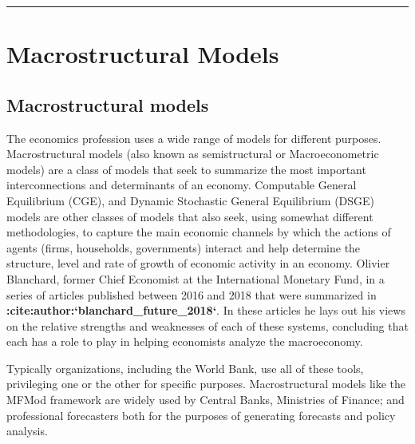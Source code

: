 \documentclass[letterpaper,10pt,english]{jupyterBook}
\begin{document}
\bigskip\hrule\bigskip


\sphinxstepscope


\part{Macrostructural Models}

\sphinxstepscope


\chapter{Macrostructural models}
\label{\detokenize{content/02_MacrostructuralModels/MacroStructuralModels:macrostructural-models}}\label{\detokenize{content/02_MacrostructuralModels/MacroStructuralModels::doc}}
\sphinxAtStartPar
The economics profession uses a wide range of models for different purposes.  Macro\sphinxhyphen{}structural models (also known as semi\sphinxhyphen{}structural or Macro\sphinxhyphen{}econometric models) are a class of models that seek to summarize the most important interconnections and determinants of an economy. Computable General Equilibrium (CGE), and Dynamic Stochastic General Equilibrium (DSGE) models are other classes of models that also seek, using somewhat different methodologies, to capture the main economic channels by which the actions of agents (firms, households, governments) interact and help determine the structure, level and rate of growth of economic activity in an economy. Olivier Blanchard, former Chief Economist at the International Monetary Fund, in a series of articles published between 2016 and 2018 that were summarized in {\color{red}\bfseries{}:cite:author:`blanchard\_future\_2018`}. In these articles he lays out his views on the relative strengths and weaknesses of each of these systems, concluding that each has a role to play in helping economists analyze the macro\sphinxhyphen{}economy.

\sphinxAtStartPar
Typically organizations, including the World Bank, use all of these tools, privileging one or the other for specific purposes. Macrostructural models like the MFMod framework are widely used by Central Banks, Ministries of Finance; and professional forecasters both for the purposes of generating forecasts and policy analysis.
\end{document}
